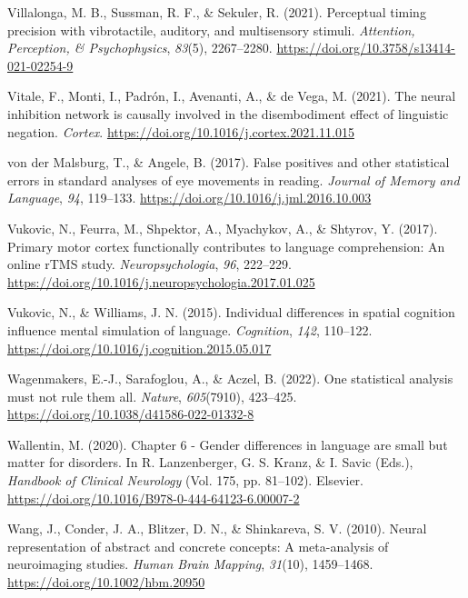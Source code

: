 \documentclass[
  12pt,
  man,floatsintext]{apa7}
\newlength{\cslhangindent}
\newlength{\cslentryspacingunit} %
\newenvironment{CSLReferences}[2] %
 {%
  \setlength{\parindent}{0pt}
  \ifodd #1
  \let\oldpar\par
  \def\par{\hangindent=\cslhangindent\oldpar}
  \fi
  \setlength{\parskip}{#2\cslentryspacingunit}
 }%
 {}
\begin{document}
\begin{CSLReferences}{1}{0}
\leavevmode{}%
Villalonga, M. B., Sussman, R. F., \& Sekuler, R. (2021). Perceptual timing precision with vibrotactile, auditory, and multisensory stimuli. \emph{Attention, Perception, \& Psychophysics}, \emph{83}(5), 2267--2280. \url{https://doi.org/10.3758/s13414-021-02254-9}

\leavevmode{}%
Vitale, F., Monti, I., Padrón, I., Avenanti, A., \& de Vega, M. (2021). The neural inhibition network is causally involved in the disembodiment effect of linguistic negation. \emph{Cortex}. \url{https://doi.org/10.1016/j.cortex.2021.11.015}

\leavevmode{}%
von der Malsburg, T., \& Angele, B. (2017). False positives and other statistical errors in standard analyses of eye movements in reading. \emph{Journal of Memory and Language}, \emph{94}, 119--133. \url{https://doi.org/10.1016/j.jml.2016.10.003}

\leavevmode{}%
Vukovic, N., Feurra, M., Shpektor, A., Myachykov, A., \& Shtyrov, Y. (2017). Primary motor cortex functionally contributes to language comprehension: {An} online {rTMS} study. \emph{Neuropsychologia}, \emph{96}, 222--229. \url{https://doi.org/10.1016/j.neuropsychologia.2017.01.025}

\leavevmode{}%
Vukovic, N., \& Williams, J. N. (2015). Individual differences in spatial cognition influence mental simulation of language. \emph{Cognition}, \emph{142}, 110--122. \url{https://doi.org/10.1016/j.cognition.2015.05.017}

\leavevmode{}%
Wagenmakers, E.-J., Sarafoglou, A., \& Aczel, B. (2022). One statistical analysis must not rule them all. \emph{Nature}, \emph{605}(7910), 423--425. \url{https://doi.org/10.1038/d41586-022-01332-8}

\leavevmode{}%
Wallentin, M. (2020). Chapter 6 - {Gender} differences in language are small but matter for disorders. In R. Lanzenberger, G. S. Kranz, \& I. Savic (Eds.), \emph{Handbook of {Clinical Neurology}} (Vol. 175, pp. 81--102). {Elsevier}. \url{https://doi.org/10.1016/B978-0-444-64123-6.00007-2}

\leavevmode{}%
Wang, J., Conder, J. A., Blitzer, D. N., \& Shinkareva, S. V. (2010). Neural representation of abstract and concrete concepts: {A} meta-analysis of neuroimaging studies. \emph{Human Brain Mapping}, \emph{31}(10), 1459--1468. \url{https://doi.org/10.1002/hbm.20950}


\end{CSLReferences}
\end{document}
